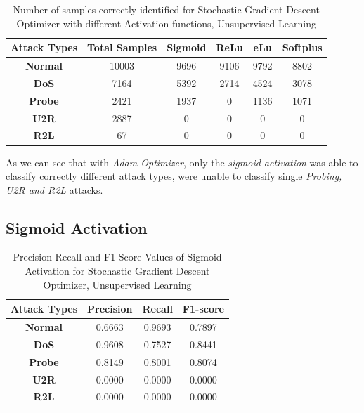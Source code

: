 \documentclass[12pt, a4paper]{report}
\begin{document}
\begin{appendices}
 
	\begin{table}[h]
	\centering
	\captionsetup{justification=centering,margin=2cm}
	\begin{tabular}{|c|c|c|c|c|c|}
	\hline
	\textbf{Attack Types} & \textbf{Total Samples} & \textbf{Sigmoid} & \textbf{ReLu} & \textbf{eLu} & \textbf{Softplus} \\ \hline
	\textbf{Normal}       & 10003                  & 9696            & 9106         & 9792        & 8802           \\ \hline
	\textbf{DoS}          & 7164                  & 5392            & 2714         & 4524        & 3078             \\ \hline
	\textbf{Probe}        & 2421                  & 1937             & 0          & 1136         & 1071              \\ \hline
	\textbf{U2R}          & 2887                    & 0             & 0           & 0          & 0               \\ \hline
	\textbf{R2L}          & 67                     & 0               & 0            & 0           & 0                \\ \hline
	\end{tabular}
	\caption{Number of samples correctly identified for Stochastic Gradient Descent Optimizer with different Activation functions, Unsupervised Learning}
	\label{confusion_sgd_tf}
	\end{table}
  
  As we can see that with \textit{Adam Optimizer}, only the \textit{sigmoid activation} was able to classify correctly different attack types, were unable to classify single \textit{Probing, U2R and R2L} attacks.
   \clearpage
   \subsection{Sigmoid Activation}
 	 \begin{table}[ht]
		\centering
		\captionsetup{justification=centering,margin=2cm}
		\begin{tabular}{|c|c|c|c|}
		\hline
		\textbf{Attack Types} & \textbf{Precision} & \textbf{Recall} & \textbf{F1-score} \\ \hline
		\textbf{Normal}       & 0.6663             & 0.9693          & 0.7897            \\ \hline
		\textbf{DoS}          & 0.9608             & 0.7527          & 0.8441            \\ \hline
		\textbf{Probe}        & 0.8149             & 0.8001          & 0.8074            \\ \hline
		\textbf{U2R}          & 0.0000             & 0.0000          & 0.0000            \\ \hline
		\textbf{R2L}          & 0.0000             & 0.0000          & 0.0000            \\ \hline
		\end{tabular}
		\caption{Precision Recall and F1-Score Values of Sigmoid Activation for Stochastic Gradient Descent Optimizer, Unsupervised Learning}
		\label{classification sigmoid sgd tf}
		\end{table} 
  

\end{appendices}
\end{document}
